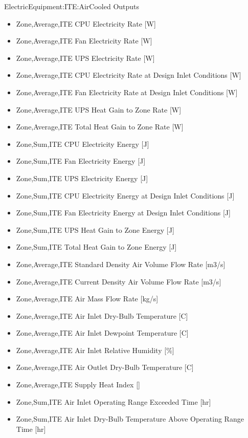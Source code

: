 ElectricEquipment:ITE:AirCooled Outputs

\begin{itemize}
\tightlist
\item
  Zone,Average,ITE CPU Electricity Rate {[}W{]}
\item
  Zone,Average,ITE Fan Electricity Rate {[}W{]}
\item
  Zone,Average,ITE UPS Electricity Rate {[}W{]}
\item
  Zone,Average,ITE CPU Electricity Rate at Design Inlet Conditions {[}W{]}
\item
  Zone,Average,ITE Fan Electricity Rate at Design Inlet Conditions {[}W{]}
\item
  Zone,Average,ITE UPS Heat Gain to Zone Rate {[}W{]}
\item
  Zone,Average,ITE Total Heat Gain to Zone Rate {[}W{]}
\item
  Zone,Sum,ITE CPU Electricity Energy {[}J{]}
\item
  Zone,Sum,ITE Fan Electricity Energy {[}J{]}
\item
  Zone,Sum,ITE UPS Electricity Energy {[}J{]}
\item
  Zone,Sum,ITE CPU Electricity Energy at Design Inlet Conditions {[}J{]}
\item
  Zone,Sum,ITE Fan Electricity Energy at Design Inlet Conditions {[}J{]}
\item
  Zone,Sum,ITE UPS Heat Gain to Zone Energy {[}J{]}
\item
  Zone,Sum,ITE Total Heat Gain to Zone Energy {[}J{]}
\item
  Zone,Average,ITE Standard Density Air Volume Flow Rate {[}m3/s{]}
\item
  Zone,Average,ITE Current Density Air Volume Flow Rate {[}m3/s{]}
\item
  Zone,Average,ITE Air Mass Flow Rate {[}kg/s{]}
\item
  Zone,Average,ITE Air Inlet Dry-Bulb Temperature {[}C{]}
\item
  Zone,Average,ITE Air Inlet Dewpoint Temperature {[}C{]}
\item
  Zone,Average,ITE Air Inlet Relative Humidity {[}\%{]}
\item
  Zone,Average,ITE Air Outlet Dry-Bulb Temperature {[}C{]}
\item
  Zone,Average,ITE Supply Heat Index {[]}
\item
  Zone,Sum,ITE Air Inlet Operating Range Exceeded Time {[}hr{]}
\item
  Zone,Sum,ITE Air Inlet Dry-Bulb Temperature Above Operating Range Time {[}hr{]}

\end{itemize}
